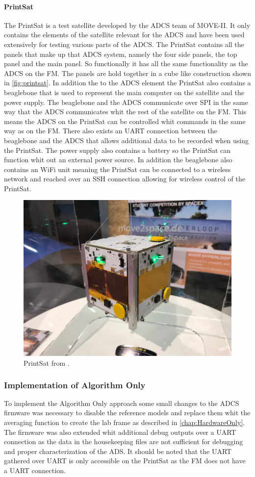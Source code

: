 \paragraph{PrintSat}
The PrintSat is a test satellite developed by the ADCS team of MOVE-II. It only contains the elements of the satellite relevant for the ADCS and have been used extensively for testing various parts of the ADCS. The PrintSat contains all the panels that make up that ADCS system, namely the four side panels, the top panel and the main panel. So functionally it has all the same functionality as the ADCS on the FM. The panels are hold together in a cube like construction shown in \autoref{fig:printsat}. In addition the to the ADCS element the PrintSat also contains a beaglebone that is used to represent the main computer on the satellite and the power supply. The beaglebone and the ADCS communicate over SPI in the same way that the ADCS communicates whit the rest of the satellite on the FM. This means the ADCS on the PrintSat can be controlled whit commands in the same way as on the FM. There also exists an UART connection between the beaglebone and the ADCS that allows additional data to be recorded when using the PrintSat. The power supply also contains a battery so the PrintSat can function whit out an external power source. In addition the beaglebone also contains an WiFi unit meaning the PrintSat can be connected to a wireless network and reached over an SSH connection allowing for wireless control of the PrintSat. 

\begin{figure}[tbp]
	\centering
	\includegraphics[width=0.5\columnwidth]{./Pictures/printsat2}
	\caption{PrintSat from \cite{DavidThesis}.}
	\label{fig:printsat}
\end{figure}

\subsubsection{Implementation of Algorithm Only}
To implement the Algorithm Only approach some small changes to the ADCS firmware was necessary to disable the reference models and replace them whit the averaging function to create the lab frame as described in \autoref{chap:HardwareOnly}. The firmware was also extended whit additional debug outputs over a UART connection as the data in the housekeeping files are not sufficient for debugging and proper characterization of the ADS. It should be noted that the UART gathered over UART is only accessible on the PrintSat as the FM does not have a UART connection.

